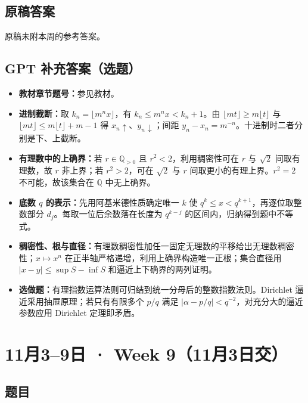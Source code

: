 \documentclass[UTF8,11pt, a4paper, oneside, fontset=none]{ctexbook}
\begin{document}
\subsection*{原稿答案}
\noindent 原稿未附本周的参考答案。
\clearpage
\subsection*{GPT 补充答案（选题）}
\begin{itemize}
\item \textbf{教材章节题号：}参见教材。
\item \textbf{进制截断：}取 $k_n=\lfloor m^n x\rfloor$，有 $k_n\le m^n x<k_n+1$。由 $\lfloor mt\rfloor\ge m\lfloor t\rfloor$ 与 $\lfloor mt\rfloor\le m\lfloor t\rfloor+m-1$ 得 $x_n\uparrow$、$y_n\downarrow$；间距 $y_n-x_n=m^{-n}$。十进制时二者分别是下、上截断。
\item \textbf{有理数中的上确界：}若 $r\in\mathbb Q_{>0}$ 且 $r^2<2$，利用稠密性可在 $r$ 与 $\sqrt2$ 间取有理数，故 $r$ 非上界；若 $r^2>2$，可在 $\sqrt2$ 与 $r$ 间取更小的有理上界。$r^2=2$ 不可能，故该集合在 $\mathbb Q$ 中无上确界。
\item \textbf{底数 $q$ 的表示：}先用阿基米德性质确定唯一 $k$ 使 $q^k\le x<q^{k+1}$，再逐位取整数部分 $d_j$。每取一位后余数落在长度为 $q^{k-j}$ 的区间内，归纳得到题中不等式。
\item \textbf{稠密性、根与直径：}有理数稠密性加任一固定无理数的平移给出无理数稠密性；$x\mapsto x^n$ 在正半轴严格递增，利用上确界构造唯一正根；集合直径用 $|x-y|\le\sup S-\inf S$ 和逼近上下确界的两列证明。
\item \textbf{选做题：}有理指数运算法则可归结到统一分母后的整数指数法则。Dirichlet 逼近采用抽屉原理；若只有有限多个 $p/q$ 满足 $|\alpha-p/q|<q^{-2}$，对充分大的逼近参数应用 Dirichlet 定理即矛盾。
\end{itemize}
\clearpage
\section{11月3--9日 · Week 9（11月3日交）}
\subsection*{题目}
\end{document}
